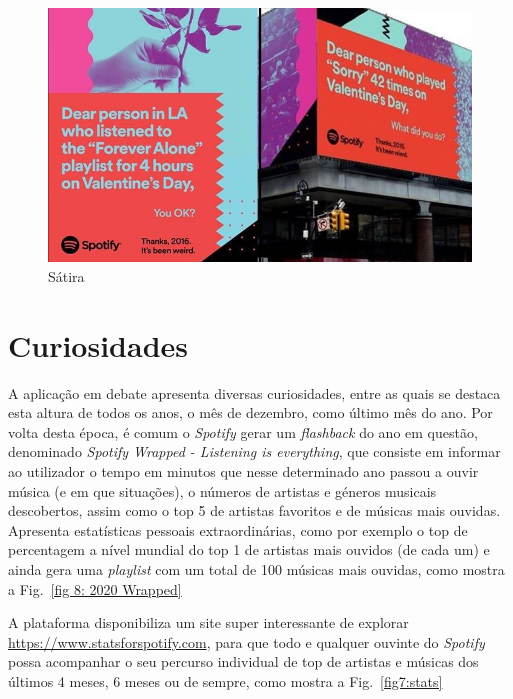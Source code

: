 \documentclass{report}
\begin{document}
%
\begin{figure}
    \centering
    \includegraphics[width=\textwidth]{Imagens/satira.jpeg}
    \caption{Sátira} \label{fig:sátira}
\end{figure}
%



\section{Curiosidades}
A aplicação em debate apresenta diversas curiosidades, entre as quais se destaca esta altura de todos os anos, o mês de dezembro, como último mês do ano. Por volta desta época, é comum o \textit{Spotify} gerar um \textit{flashback} do ano em questão, denominado \textit{Spotify Wrapped - Listening is everything}, que consiste em informar ao utilizador o tempo em minutos que nesse determinado ano passou a ouvir música (e em que situações), o números de artistas e géneros musicais descobertos, assim como o top 5 de artistas favoritos e de músicas mais ouvidas. Apresenta estatísticas pessoais extraordinárias, como por exemplo o top de percentagem a nível mundial do top 1 de artistas mais ouvidos (de cada um) e ainda gera uma \textit{playlist} com um total de 100 músicas mais ouvidas, como mostra a Fig.~\ref{fig 8: 2020 Wrapped}

A plataforma disponibiliza um site super interessante de explorar \url{https://www.statsforspotify.com}, para que todo e qualquer ouvinte do \textit{Spotify} possa acompanhar o seu percurso individual de top de artistas e músicas dos últimos 4 meses, 6 meses ou de sempre, como mostra a Fig.~\ref{fig7:stats}
\end{document}
